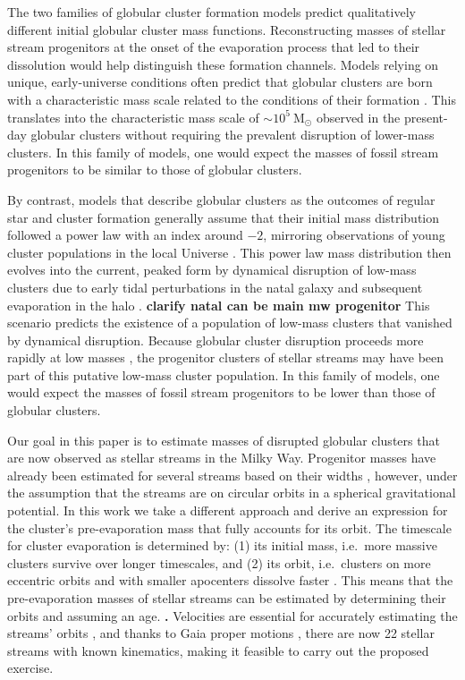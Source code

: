 \documentclass[twocolumn]{aastex63}
\newcommand{\msun}{\ensuremath{\textrm{M}_\odot}}
\newcommand{\changes}[1]{{\textbf{#1}}}
\begin{document}
The two families of globular cluster formation models predict qualitatively different initial globular cluster mass functions.
Reconstructing masses of stellar stream progenitors at the onset of the evaporation process that led to their dissolution would help distinguish these formation channels.
Models relying on unique, early-universe conditions often predict that globular clusters are born with a characteristic mass scale related to the conditions of their formation \citep[e.g.][]{peebles:1968,fall:1985,trenti:2015,madau:2020}.
This translates into the characteristic mass scale of $\sim10^5~\msun$ observed in the present-day globular clusters without requiring the prevalent disruption of lower-mass clusters.
In this family of models, one would expect the masses of fossil stream progenitors to be similar to those of globular clusters.

By contrast, models that describe globular clusters as the outcomes of regular star and cluster formation generally assume that their initial mass distribution followed a power law with an index around $-2$, mirroring observations of young cluster populations in the local Universe \citep[e.g.,][]{larsen:2009,adamo:2020}.
This power law mass distribution then evolves into the current, peaked form by dynamical disruption of low-mass clusters due to early tidal perturbations in the natal galaxy and subsequent evaporation in the halo \citep{elmegreen:1997,fall:2001,elmegreen:2010,kruijssen15b}.
\changes{clarify natal can be main mw progenitor}
This scenario predicts the existence of a population of low-mass clusters that vanished by dynamical disruption.
Because globular cluster disruption proceeds more rapidly at low masses \citep{baumgardt03,krumholz:2019}, the progenitor clusters of stellar streams may have been part of this putative low-mass cluster population.
In this family of models, one would expect the masses of fossil stream progenitors to be lower than those of globular clusters.

Our goal in this paper is to estimate masses of disrupted globular clusters that are now observed as stellar streams in the Milky Way.
Progenitor masses have already been estimated for several streams based on their widths \citep{erkal:2016b, erkal:2016, shipp:2018}, however, under the assumption that the streams are on circular orbits in a spherical gravitational potential.
In this work we take a different approach and derive an expression for the cluster's pre-evaporation mass that fully accounts for its orbit.
The timescale for cluster evaporation is determined by: (1) its initial mass, i.e.\ more massive clusters survive over longer timescales, and (2) its orbit, i.e.\ clusters on more eccentric orbits and with smaller apocenters dissolve faster \citep{baumgardt03,kruijssen09}.
This means that the pre-evaporation masses of stellar streams can be estimated by determining their orbits and assuming an age.
\changes{.}
Velocities are essential for accurately estimating the streams' orbits \citep{bh:2018}, and thanks to Gaia proper motions \citep{gdr2}, there are now 22 stellar streams with known kinematics, making it feasible to carry out the proposed exercise.
\end{document}
